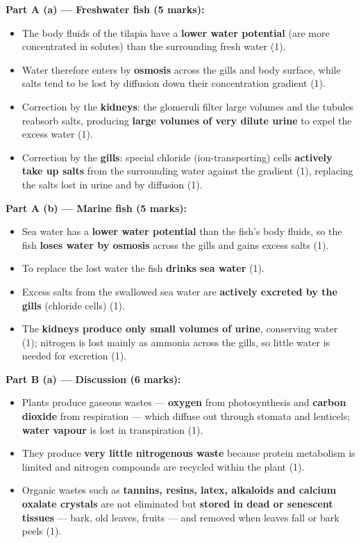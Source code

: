 \documentclass[11pt]{article}
\begin{document}
\begin{corrige}
\textbf{Part A (a) — Freshwater fish (5 marks):}
\begin{itemize}
\item The body fluids of the tilapia have a \textbf{lower water potential} (are more concentrated in solutes) than the surrounding fresh water (1).
\item Water therefore enters by \textbf{osmosis} across the gills and body surface, while salts tend to be lost by diffusion down their concentration gradient (1).
\item Correction by the \textbf{kidneys}: the glomeruli filter large volumes and the tubules reabsorb salts, producing \textbf{large volumes of very dilute urine} to expel the excess water (1).
\item Correction by the \textbf{gills}: special chloride (ion-transporting) cells \textbf{actively take up salts} from the surrounding water against the gradient (1), replacing the salts lost in urine and by diffusion (1).
\end{itemize}
\textbf{Part A (b) — Marine fish (5 marks):}
\begin{itemize}
\item Sea water has a \textbf{lower water potential} than the fish's body fluids, so the fish \textbf{loses water by osmosis} across the gills and gains excess salts (1).
\item To replace the lost water the fish \textbf{drinks sea water} (1).
\item Excess salts from the swallowed sea water are \textbf{actively excreted by the gills} (chloride cells) (1).
\item The \textbf{kidneys produce only small volumes of urine}, conserving water (1); nitrogen is lost mainly as ammonia across the gills, so little water is needed for excretion (1).
\end{itemize}
\textbf{Part B (a) — Discussion (6 marks):}
\begin{itemize}
\item Plants produce gaseous wastes — \textbf{oxygen} from photosynthesis and \textbf{carbon dioxide} from respiration — which diffuse out through stomata and lenticels; \textbf{water vapour} is lost in transpiration (1).
\item They produce \textbf{very little nitrogenous waste} because protein metabolism is limited and nitrogen compounds are recycled within the plant (1).
\item Organic wastes such as \textbf{tannins, resins, latex, alkaloids and calcium oxalate crystals} are not eliminated but \textbf{stored in dead or senescent tissues} — bark, old leaves, fruits — and removed when leaves fall or bark peels (1).

\end{itemize}
\end{corrige}
\end{document}
